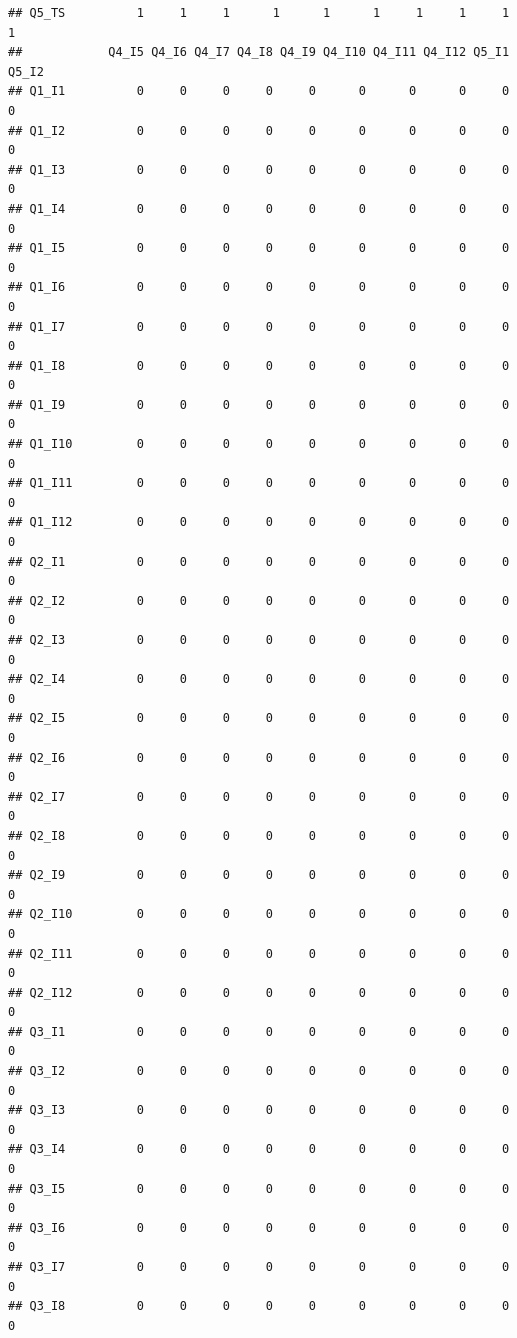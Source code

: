 \documentclass[]{book}
\begin{document}
\begin{verbatim}
## Q5_TS          1     1     1      1      1      1     1     1     1     1
##            Q4_I5 Q4_I6 Q4_I7 Q4_I8 Q4_I9 Q4_I10 Q4_I11 Q4_I12 Q5_I1 Q5_I2
## Q1_I1          0     0     0     0     0      0      0      0     0     0
## Q1_I2          0     0     0     0     0      0      0      0     0     0
## Q1_I3          0     0     0     0     0      0      0      0     0     0
## Q1_I4          0     0     0     0     0      0      0      0     0     0
## Q1_I5          0     0     0     0     0      0      0      0     0     0
## Q1_I6          0     0     0     0     0      0      0      0     0     0
## Q1_I7          0     0     0     0     0      0      0      0     0     0
## Q1_I8          0     0     0     0     0      0      0      0     0     0
## Q1_I9          0     0     0     0     0      0      0      0     0     0
## Q1_I10         0     0     0     0     0      0      0      0     0     0
## Q1_I11         0     0     0     0     0      0      0      0     0     0
## Q1_I12         0     0     0     0     0      0      0      0     0     0
## Q2_I1          0     0     0     0     0      0      0      0     0     0
## Q2_I2          0     0     0     0     0      0      0      0     0     0
## Q2_I3          0     0     0     0     0      0      0      0     0     0
## Q2_I4          0     0     0     0     0      0      0      0     0     0
## Q2_I5          0     0     0     0     0      0      0      0     0     0
## Q2_I6          0     0     0     0     0      0      0      0     0     0
## Q2_I7          0     0     0     0     0      0      0      0     0     0
## Q2_I8          0     0     0     0     0      0      0      0     0     0
## Q2_I9          0     0     0     0     0      0      0      0     0     0
## Q2_I10         0     0     0     0     0      0      0      0     0     0
## Q2_I11         0     0     0     0     0      0      0      0     0     0
## Q2_I12         0     0     0     0     0      0      0      0     0     0
## Q3_I1          0     0     0     0     0      0      0      0     0     0
## Q3_I2          0     0     0     0     0      0      0      0     0     0
## Q3_I3          0     0     0     0     0      0      0      0     0     0
## Q3_I4          0     0     0     0     0      0      0      0     0     0
## Q3_I5          0     0     0     0     0      0      0      0     0     0
## Q3_I6          0     0     0     0     0      0      0      0     0     0
## Q3_I7          0     0     0     0     0      0      0      0     0     0
## Q3_I8          0     0     0     0     0      0      0      0     0     0

\end{verbatim}
\end{document}
